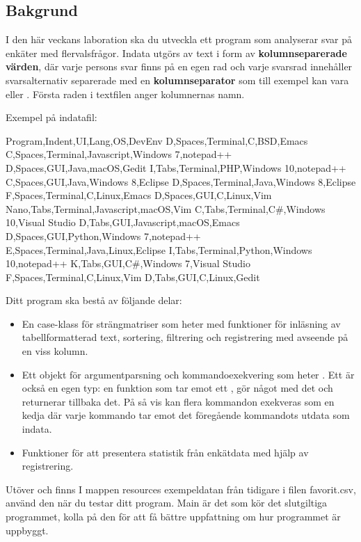 \subsection{Bakgrund}

I den här veckans laboration ska du utveckla ett program som analyserar svar på enkäter med flervalsfrågor. Indata utgörs av text i form av \textbf{kolumnseparerade värden}, där varje persons svar finns på en egen rad och varje svarsrad innehåller svarsalternativ separerade med en \textbf{kolumnseparator} som till exempel kan vara \code{\t} eller \code{,}. Första raden i textfilen anger kolumnernas namn.

Exempel på indatafil:%
\begin{CodeSmall}[language=, ]
Program,Indent,UI,Lang,OS,DevEnv
D,Spaces,Terminal,C,BSD,Emacs
C,Spaces,Terminal,Javascript,Windows 7,notepad++
D,Spaces,GUI,Java,macOS,Gedit
I,Tabs,Terminal,PHP,Windows 10,notepad++
C,Spaces,GUI,Java,Windows 8,Eclipse
D,Spaces,Terminal,Java,Windows 8,Eclipse
F,Spaces,Terminal,C,Linux,Emacs
D,Spaces,GUI,C,Linux,Vim
Nano,Tabs,Terminal,Javascript,macOS,Vim
C,Tabs,Terminal,C#,Windows 10,Visual Studio
D,Tabs,GUI,Javascript,macOS,Emacs
D,Spaces,GUI,Python,Windows 7,notepad++
E,Spaces,Terminal,Java,Linux,Eclipse
I,Tabs,Terminal,Python,Windows 10,notepad++
K,Tabs,GUI,C#,Windows 7,Visual Studio
F,Spaces,Terminal,C,Linux,Vim
D,Tabs,GUI,C,Linux,Gedit
\end{CodeSmall}

Ditt program ska bestå av följande delar:
\begin{itemize}
\item En case-klass för strängmatriser som heter  med funktioner för inläsning av tabellformatterad text, sortering, filtrering och registrering med avseende på en viss kolumn.
\item Ett objekt för argumentparsning och kommandoexekvering som heter . Ett  är också en egen typ: en funktion som tar emot ett , gör något med det och returnerar tillbaka det. På så vis kan flera kommandon exekveras som en kedja där varje kommando tar emot det föregående kommandots utdata som indata.
\item Funktioner för att presentera statistik från enkätdata med hjälp av registrering.
\end{itemize}

Utöver  och  finns I mappen resources exempeldatan från tidigare i filen favorit.csv, använd den när du testar ditt program.
Main är det som kör det slutgiltiga programmet, kolla på den för att få bättre uppfattning om hur programmet är uppbyggt.

